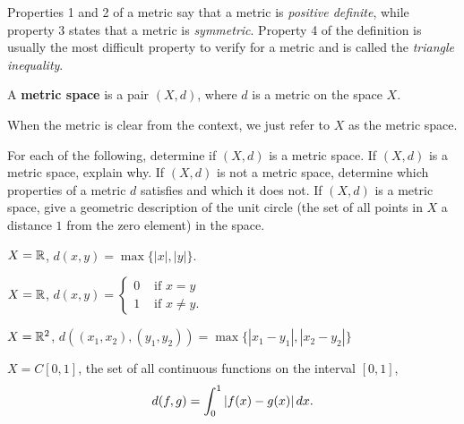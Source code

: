 Properties 1 and 2 of a metric say that a metric is \emph{positive definite}, while property 3 states that a metric is \emph{symmetric}. Property 4 of the definition is usually the most difficult property to verify for a metric and is called the \emph{triangle inequality}. 

\begin{definition} A \textbf{metric space} is a pair $(X,d)$, where $d$ is a metric on the space $X$. 
\end{definition}

When the metric is clear from the context, we just refer to $X$ as the metric space.


\begin{activity} \label{act:MS_metrics} For each of the following, determine if $(X,d)$ is a metric space. If $(X,d)$ is a metric space, explain why. If $(X,d)$ is not a metric space, determine which properties of a metric $d$ satisfies and which it does not. If $(X,d)$ is a metric space, give a geometric description of the unit circle (the set of all points in $X$ a distance $1$ from the zero element) in the space.  
	\ba
	\item $X = \mathbb{R}$, $d(x,y) = \max\{|x|,|y|\}$. 

	
	\item $X = \mathbb{R}$, $d(x,y) = \begin{cases} 0 & \text{ if } x=y \\ 1 & \text{ if } x \neq y. \end{cases}$


	\item $X = \mathbb{R}^2$, $d((x_1,x_2),(y_1,y_2)) = \max\{| x_1-y_1 |, | x_2-y_2 | \}$ 

 
	\item $X = C[0,1]$, the set of all continuous functions on the interval $[0,1]$, 
	\[d(f,g) = \displaystyle \int_0^1 | f(x) - g(x) | \, dx.\] 

	\ea

\end{activity}

